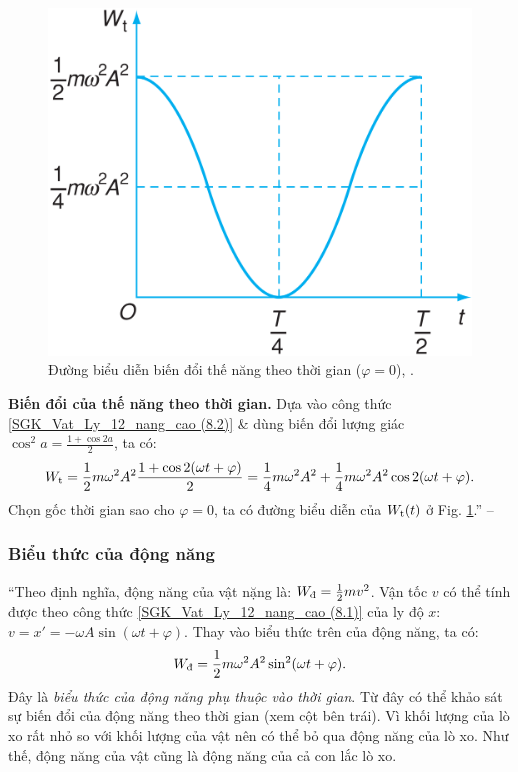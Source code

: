 \documentclass{article}
\numberwithin{equation}{section}
\begin{document}
\begin{figure}[H]
	\centering
	\includegraphics[scale=0.15]{duong_bieu_dien_bien_doi_the_nang_theo_thoi_gian}
	\caption{Đường biểu diễn biến đổi thế năng theo thời gian ($\varphi = 0$), \cite[Hình 8.1, p. 41]{SGK_Vat_Ly_12_nang_cao}.}
	\label{fig:duong_bieu_dien_bien_doi_the_nang_theo_thoi_gian}
\end{figure}
\textbf{Biến đổi của thế năng theo thời gian.} Dựa vào công thức \eqref{SGK_Vat_Ly_12_nang_cao (8.2)} \& dùng biến đổi lượng giác $\cos^2a = \frac{1 + \cos2a}{2}$, ta có:
\begin{align*}
	W_{\rm t} = \frac{1}{2}m\omega^2A^2\frac{1 + \cos2(\omega t + \varphi)}{2} = \frac{1}{4}m\omega^2A^2 + \frac{1}{4}m\omega^2A^2\cos2(\omega t + \varphi).
\end{align*}
Chọn gốc thời gian sao cho $\varphi = 0$, ta có đường biểu diễn của $W_{\rm t}(t)$ ở Fig. \ref{fig:duong_bieu_dien_bien_doi_the_nang_theo_thoi_gian}.'' -- \cite[p. 41]{SGK_Vat_Ly_12_nang_cao}

\subsubsection{Biểu thức của động năng}
``Theo định nghĩa, động năng của vật nặng là: $W_{\mbox{\scriptsize\rm đ}} = \frac{1}{2}mv^2$. Vận tốc $v$ có thể tính được theo công thức \eqref{SGK_Vat_Ly_12_nang_cao (8.1)} của ly độ $x$: $v = x' = -\omega A\sin(\omega t + \varphi)$. Thay vào biểu thức trên của động năng, ta có:
\begin{align}
	\label{SGK_Vat_Ly_12_nang_cao (8.3)}
	W_{\mbox{\scriptsize\rm đ}} = \frac{1}{2}m\omega^2A^2\sin^2(\omega t + \varphi).
\end{align}
Đây là \textit{biểu thức của động năng phụ thuộc vào thời gian}. Từ đây có thể khảo sát sự biến đổi của động năng theo thời gian (xem cột bên trái). Vì khối lượng của lò xo rất nhỏ so với khối lượng của vật nên có thể bỏ qua động năng của lò xo. Như thế, động năng của vật cũng là động năng của cả con lắc lò xo.
\end{document}
